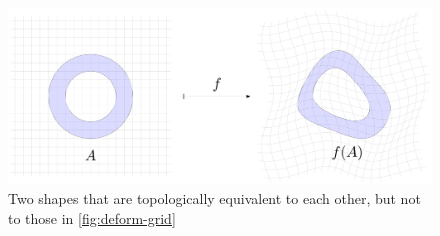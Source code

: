 \documentclass{fkpaper}
\begin{document}
\begin{figure}[H]
  \centering
  \includegraphics[scale=.325, angle=0]{figures/deform-grid-annulus.pdf}
  \caption{Two shapes that are topologically equivalent to each other,
    but not to those in \cref{fig:deform-grid}}
  \label{fig:deform-annulus}
\end{figure}
\end{document}
